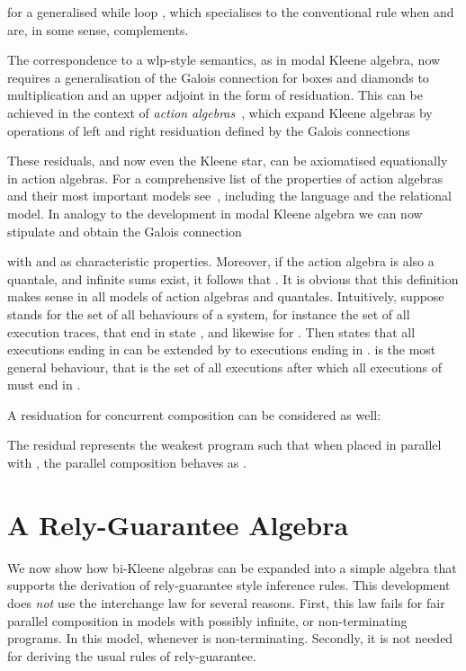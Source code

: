 \documentclass{llncs}
\begin{document}
for a generalised while loop , which
specialises to the conventional rule when  and  are, in some
sense, complements.

The correspondence to a wlp-style semantics, as in modal Kleene
algebra, now requires a generalisation of the Galois connection for
boxes and diamonds to multiplication and an upper adjoint in the form
of residuation.  This can be achieved in the context of \emph{action
  algebras}~\cite{pratt_action_1990}, which expand Kleene algebras by operations
of left and right residuation defined by the Galois connections

These residuals, and now even the Kleene star, can be axiomatised
equationally in action algebras. For a comprehensive list of the
properties of action algebras and their most important models
see~\cite{armstrong_kleene_2013}, including the language and the relational
model. In analogy to the development in modal Kleene algebra we can
now stipulate  and obtain the Galois
connection

with  and  as characteristic properties. Moreover, if the
action algebra is also a quantale, and infinite sums exist, it follows
that .  It is obvious that
this definition makes sense in all models of action algebras and
quantales. Intuitively, suppose  stands for the set of all
behaviours of a system, for instance the set of all execution traces,
that end in state , and likewise for . Then  states
that all executions ending in  can be extended by  to executions
ending in .  is the most general behaviour, that is the
set of all executions  after which all executions of  must end
in .

A residuation for concurrent composition can be considered as well:

The residual  represents the weakest program such that when
placed in parallel with , the parallel composition behaves as .



\section{A  Rely-Guarantee Algebra}
\label{sec:RG}

We now show how bi-Kleene algebras can be expanded into a
simple algebra that supports the derivation of rely-guarantee style
inference rules. This development does \emph{not} use the interchange
law for several reasons. First, this law fails for fair parallel
composition  in models with possibly infinite, or
non-terminating programs. In this model,  whenever  is non-terminating. Secondly, it is not
needed for deriving the usual rules of rely-guarantee.
\end{document}
